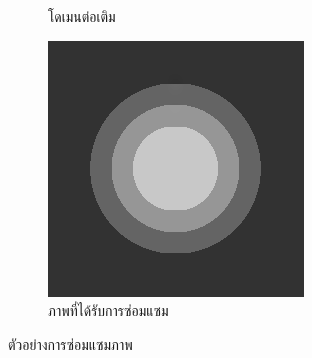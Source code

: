 \documentclass[xcolor=dvipsnames, xetex,serif]{beamer}
\numberwithin{equation}{section}
\begin{document}
\begin{frame}
\begin{figure}[H]
\begin{subfigure}{0.3\linewidth}
                \caption{โดเมนต่อเติม}
            \end{subfigure}
            \begin{subfigure}{0.3\linewidth}
                \centering
                \includegraphics[width=0.8\linewidth]{images/grayscale_inpaint/result_splitbergman.png}
                \caption{ภาพที่ได้รับการซ่อมแซม}
            \end{subfigure}
            \caption{ตัวอย่างการซ่อมแซมภาพ}
        \end{figure}
    \end{frame}
\end{document}
